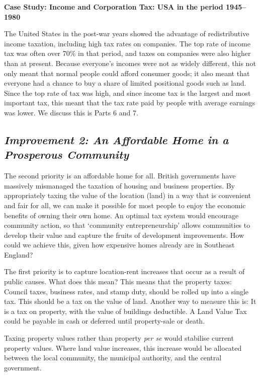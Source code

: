 \documentclass[]{tufte-handout}
\begin{document}
\textbf{Case Study: Income and Corporation Tax: USA in the period
1945--1980}

The United States in the post-war years showed the advantage of
redistributive income taxation, including high tax rates on companies.
The top rate of income tax was often over 70\% in that period, and taxes
on companies were also higher than at present. Because everyone's
incomes were not as widely different, this not only meant that normal
people could afford consumer goods; it also meant that everyone had a
chance to buy a share of limited positional goods such as land. Since
the top rate of tax was high, and since income tax is the largest and
most important tax, this meant that the tax rate paid by people with
average earnings was lower. We discuss this is Parts 6 and 7.

\hypertarget{improvement-2-an-affordable-home-in-a-prosperous-community}{%
\subsection{\texorpdfstring{\emph{Improvement 2: An Affordable Home in a
Prosperous
Community}}{Improvement 2: An Affordable Home in a Prosperous Community}}\label{improvement-2-an-affordable-home-in-a-prosperous-community}}

The second priority is an affordable home for all. British governments
have massively mismanaged the taxation of housing and business
properties. By appropriately taxing the value of the location (land) in
a way that is convenient and fair for all, we can make it possible for
most people to enjoy the economic benefits of owning their own home. An
optimal tax system would encourage community action, so that `community
entrepreneurship' allows communities to develop their value and capture
the fruits of development improvements. How could we achieve this, given
how expensive homes already are in Southeast England?

The first priority is to capture location-rent increases that occur as a
result of public causes. What does this mean? This means that the
property taxes: Council taxes, business rates, and stamp duty, should be
rolled up into a single tax. This should be a tax on the value of land.
Another way to measure this is: It is a tax on property, with the value
of buildings deductible. A Land Value Tax could be payable in cash or
deferred until property-sale or death.

Taxing property values rather than property \emph{per se} would
stabilise current property values. Where land value increases, this
increase would be allocated between the local community, the municipal
authority, and the central government.
\end{document}
